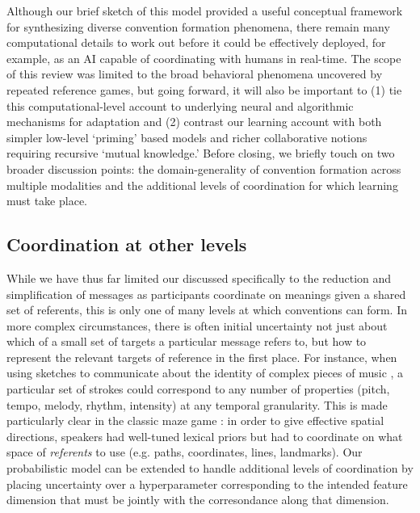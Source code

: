 Although our brief sketch of this model provided a useful conceptual framework for synthesizing diverse convention formation phenomena, there remain many computational details to work out before it could be effectively deployed, for example, as an AI capable of coordinating with humans in real-time. 
The scope of this review was limited to the broad behavioral phenomena uncovered by repeated reference games, but going forward, it will also be important to (1) tie this computational-level account to underlying neural and algorithmic mechanisms for adaptation and (2) contrast our learning account with both simpler low-level `priming' based models and richer collaborative notions requiring recursive `mutual knowledge.' Before closing, we briefly touch on two broader discussion points: the domain-generality of convention formation across multiple modalities and the additional levels of coordination for which learning must take place.

\subsection{Coordination at other levels}

While we have thus far limited our discussed specifically to the reduction and simplification of messages as participants coordinate on meanings given a shared set of referents, this is only one of many levels at which conventions can form. In more complex circumstances, there is often initial uncertainty not just about which of a small set of targets a particular message refers to, but how to represent the relevant targets of reference in the first place. For instance, when using sketches to communicate about the identity of complex pieces of music \cite{HealeySwobodaUmataKing07_GraphicalLanguageGames}, a particular set of strokes could correspond to any number of properties (pitch, tempo, melody, rhythm, intensity) at any temporal granularity. This is made particularly clear in the classic maze game \cite{GarrodAnderson87_SayingWhatYouMean}: in order to give effective spatial directions, speakers had well-tuned lexical priors but had to coordinate on what space of \emph{referents} to use (e.g. paths, coordinates, lines, landmarks). Our probabilistic model can be extended to handle additional levels of coordination by placing uncertainty over a hyperparameter corresponding to the intended feature dimension that must be jointly with the corresondance along that dimension. 

